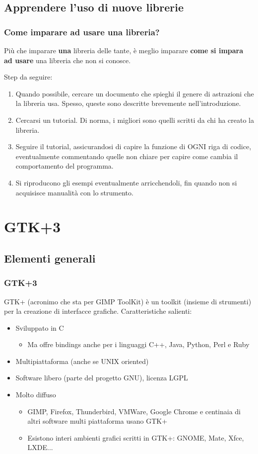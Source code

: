 \documentclass{beamer}
\begin{document}
\subsection{Apprendere l'uso di nuove librerie}

\begin{frame}
\frametitle{Come imparare ad usare una libreria?}
Più che imparare \textbf{una} libreria delle tante, è meglio imparare \textbf{come si impara ad usare} una libreria che non si conosce.

Step da seguire:
\begin{enumerate}
 \item Quando possibile, cercare un documento che spieghi il genere di astrazioni che la libreria usa. Spesso, queste sono descritte brevemente nell'introduzione.
 \item Cercarsi un tutorial. Di norma, i migliori sono quelli scritti da chi ha creato la libreria.
 \item Seguire il tutorial, assicurandosi di capire la funzione di OGNI riga di codice, eventualmente commentando quelle non chiare per capire come cambia il comportamento del programma.
 \item Si riproducono gli esempi eventualmente arricchendoli, fin quando non si acquisisce manualità con lo strumento.
\end{enumerate}
\end{frame}

\section{GTK+3}

\subsection{Elementi generali}

\begin{frame}
\frametitle{GTK+3}
GTK+ (acronimo che sta per GIMP ToolKit) è un toolkit (insieme di strumenti) per la creazione di interfacce grafiche. Caratteristiche salienti:
\begin{itemize}
 \item Sviluppato in C
 \begin{itemize}
  \item Ma offre bindings anche per i linguaggi C++, Java, Python, Perl e Ruby
 \end{itemize}
 \item Multipiattaforma (anche se UNIX oriented)
 \item Software libero (parte del progetto GNU), licenza LGPL
 \item Molto diffuso
 \begin{itemize}
  \item GIMP, Firefox, Thunderbird, VMWare, Google Chrome e centinaia di altri software multi piattaforma usano GTK+
  \item Esistono interi ambienti grafici scritti in GTK+: GNOME, Mate, Xfce, LXDE...
 \end{itemize}
\end{itemize}
\end{frame}
\end{document}

